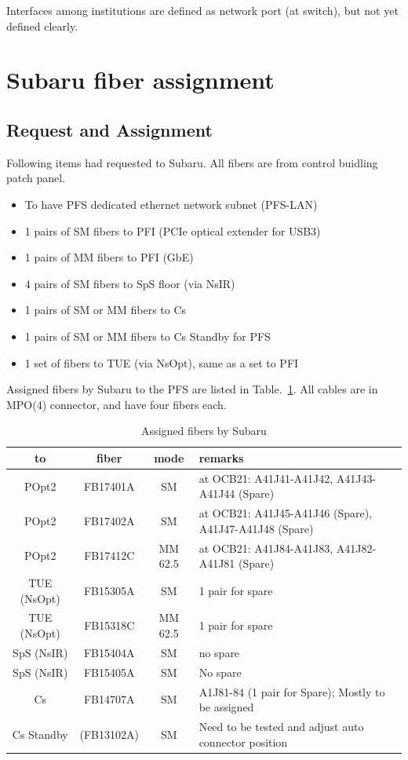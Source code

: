\documentclass[a4paper,notitlepage]{article}
\begin{document}
Interfaces among institutions are defined as network port (at switch), 
but not yet defined clearly. 

\section{Subaru fiber assignment}

\subsection{Request and Assignment}

Following items had requested to Subaru. 
All fibers are from control buidling patch panel. 

\begin{itemize}
  \item To have PFS dedicated ethernet network subnet (PFS-LAN)
  \item 1 pairs of SM fibers to PFI (PCIe optical extender for USB3)
  \item 1 pairs of MM fibers to PFI (GbE)
  \item 4 pairs of SM fibers to SpS floor (via NsIR)
  \item 1 pairs of SM or MM fibers to Cs
  \item 1 pairs of SM or MM fibers to Cs Standby for PFS
  \item 1 set of fibers to TUE (via NsOpt), same as a set to PFI
\end{itemize}

Assigned fibers by Subaru to the PFS are listed 
in Table.~\ref{tab:subaru-fiber}.
All cables are in MPO(4) connector, and have four fibers each. 

\begin{table}[htb]
\begin{center}
\caption{Assigned fibers by Subaru}
\label{tab:subaru-fiber}
\begin{tabular}{c|c|c|l}
to & fiber & mode & remarks \\
\hline
POpt2 & FB17401A & SM & at OCB21: A41J41-A41J42, A41J43-A41J44 (Spare) \\
POpt2 & FB17402A & SM & at OCB21: A41J45-A41J46 (Spare), A41J47-A41J48 (Spare) \\
POpt2 & FB17412C & MM 62.5 & at OCB21: A41J84-A41J83, A41J82-A41J81 (Spare) \\
\hline
TUE (NsOpt) & FB15305A & SM & 1 pair for spare \\
TUE (NsOpt) & FB15318C & MM 62.5 & 1 pair for spare \\
\hline
SpS (NsIR) & FB15404A & SM & no spare \\
SpS (NsIR) & FB15405A & SM & No spare \\
\hline
Cs & FB14707A & SM & A1J81-84 (1 pair for Spare); Mostly to be assigned \\
Cs Standby & (FB13102A) & SM & Need to be tested and adjust auto connector position
\end{tabular}
\end{center}
\end{table}
\end{document}
